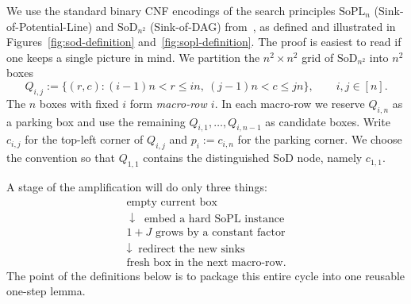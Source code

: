 \documentclass[11pt]{article}
\theoremstyle{definition}
\newcommand{\SoPL}{\mathrm{SoPL}}
\newcommand{\SoD}{\mathrm{SoD}}
\begin{document}
We use the standard binary CNF encodings of the search principles $\SoPL_n$
(Sink-of-Potential-Line) and $\SoD_{n^2}$ (Sink-of-DAG) from~\cite{GHJMPRT},
as defined and illustrated in Figures~\ref{fig:sod-definition} and~\ref{fig:sopl-definition}.
The proof is easiest to read if one keeps a single picture in mind.  We partition the
$n^2\times n^2$ grid of $\SoD_{n^2}$ into $n^2$ boxes
\[
  Q_{i,j}:=\{(r,c):(i-1)n<r\le in,\ (j-1)n<c\le jn\},
  \qquad i,j\in[n].
\]
The $n$ boxes with fixed $i$ form \emph{macro-row $i$}.  In each macro-row we reserve
$Q_{i,n}$ as a parking box and use the remaining $Q_{i,1},\ldots,Q_{i,n-1}$ as
candidate boxes.  Write $c_{i,j}$ for the top-left corner of $Q_{i,j}$ and
$p_i:=c_{i,n}$ for the parking corner.  We choose the convention so that
$Q_{1,1}$ contains the distinguished $\SoD$ node, namely $c_{1,1}$.

A stage of the amplification will do only three things:
\[
\begin{array}{c}
  \text{empty current box}\\[2pt]
  \downarrow\ \text{ embed a hard $\SoPL$ instance}\\[2pt]
  \text{$1+J$ grows by a constant factor}\\[2pt]
  \downarrow\ \text{ redirect the new sinks}\\[2pt]
  \text{fresh box in the next macro-row.}
\end{array}
\]
The point of the definitions below is to package this entire cycle into one reusable
one-step lemma.
\end{document}
